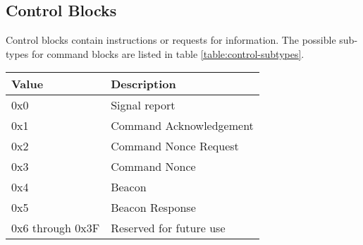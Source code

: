 \subsection{Control Blocks}
Control blocks contain instructions or requests for information. The possible sub-types for command blocks are listed
in table \ref{table:control-subtypes}.

\begin{table*}[htb]
    \centering
    \begin{tabular}{@{}ll@{}}
        \toprule
        Value            & Description             \\
        \midrule
        0x0              & Signal report           \\
        0x1              & Command Acknowledgement \\
        0x2              & Command Nonce Request   \\
        0x3              & Command Nonce           \\
        0x4              & Beacon                  \\
        0x5              & Beacon Response         \\
        0x6 through 0x3F & Reserved for future use \\
        \bottomrule
    \end{tabular}
    \caption{Control Block Subtypes}
    \label{table:control-subtypes}
\end{table*}



